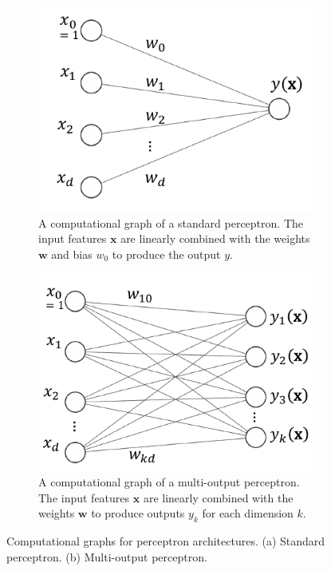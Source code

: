 \begin{figure}[h]
    \centering
    \begin{subfigure}[b]{0.45\linewidth}
        \centering
        \includegraphics[width=\linewidth]{images/nn_perceptron.pdf}
        \caption{A computational graph of a standard perceptron. The input features $\mathbf{x}$ are linearly combined with the weights $\mathbf{w}$ and bias $w_0$ to produce the output $y$.}
        \label{fig:nn-perceptron}
    \end{subfigure}
    \hfill
    \begin{subfigure}[b]{0.45\linewidth}
        \centering
        \includegraphics[width=\linewidth]{images/nn_multiclass.pdf}
        \caption{A computational graph of a multi-output perceptron. The input features $\mathbf{x}$ are linearly combined with the weights $\mathbf{w}$ to produce outputs $y_k$ for each dimension $k$.}
        \label{fig:nn-multiclass}
    \end{subfigure}
    \caption{Computational graphs for perceptron architectures. (a) Standard perceptron. (b) Multi-output perceptron.}
    \label{fig:nn-combined}
\end{figure}

